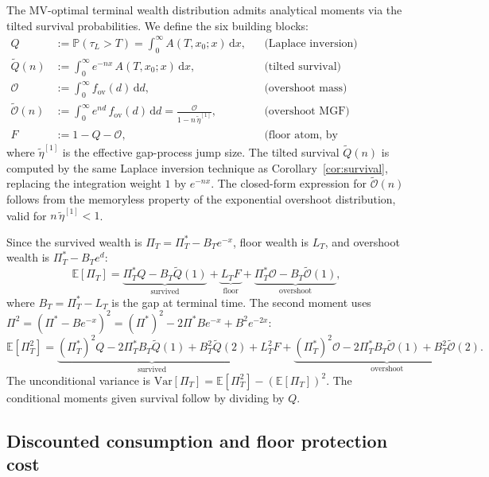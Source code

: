 \documentclass[11pt,a4paper]{article}
\numberwithin{equation}{section}
\newcommand{\E}{\mathbb{E}}
\newcommand{\Var}{\mathrm{Var}}
\newcommand{\Prob}{\mathbb{P}}
\newcommand{\Ov}{\mathcal{O}} %
\newcommand{\dd}{\mathrm{d}}
\begin{document}
The MV-optimal terminal wealth distribution admits analytical moments via the tilted survival probabilities. We define the six building blocks:
\begin{align}
Q &:= \Prob(\tau_L > T) = \int_0^\infty A(T, x_0; x)\,\dd x, 
  & &\text{(Laplace inversion)} \label{eq:Q_def}\\
\widetilde{Q}(n) &:= \int_0^\infty e^{-nx}\, A(T, x_0; x)\,\dd x, 
  & &\text{(tilted survival)} \label{eq:TQ_def}\\
\Ov &:= \int_0^\infty f_{\mathrm{ov}}(d)\,\dd d, 
  & &\text{(overshoot mass)} \label{eq:O_def}\\
\widetilde{\Ov}(n) &:= \int_0^\infty e^{nd}\, f_{\mathrm{ov}}(d)\,\dd d 
  = \frac{\Ov}{1 - n\,\tilde\eta^{[1]}}, 
  & &\text{(overshoot MGF)} \label{eq:TO_def}\\
F &:= 1 - Q - \Ov, 
  & &\text{(floor atom, by complement)} \label{eq:F_def}
\end{align}
where $\tilde\eta^{[1]}$ is the effective gap-process jump size. The 
tilted survival $\widetilde{Q}(n)$ is computed by the same Laplace 
inversion technique as Corollary~\ref{cor:survival}, replacing the 
integration weight $1$ by $e^{-nx}$. The closed-form expression for 
$\widetilde{\Ov}(n)$ follows from the memoryless property of the 
exponential overshoot distribution, valid for 
$n\,\tilde\eta^{[1]} < 1$.


Since the survived wealth is $\Pi_T = \Pi^*_T - B_T e^{-x}$, floor wealth is $L_T$, 
and overshoot wealth is $\Pi^*_T - B_T e^d$:
\begin{equation}\label{eq:E_Pi}
\E[\Pi_T] = \underbrace{\Pi^*_T Q - B_T \widetilde{Q}(1)}_{\text{survived}} 
  + \underbrace{L_T F}_{\text{floor}} 
  + \underbrace{\Pi^*_T \Ov - B_T \widetilde{\Ov}(1)}_{\text{overshoot}},
\end{equation}
where $B_T = \Pi^*_T - L_T$ is the gap at terminal time.
The second moment uses $\Pi^2 = (\Pi^* - Be^{-x})^2 
  = (\Pi^*)^2 - 2\Pi^* B e^{-x} + B^2 e^{-2x}$:
\begin{equation}\label{eq:E2_Pi}
\E[\Pi_T^2] = \underbrace{(\Pi^*_T)^2 Q - 2\Pi^*_T B_T \widetilde{Q}(1) 
  + B_T^2 \widetilde{Q}(2)}_{\text{survived}} + L_T^2 F 
  + \underbrace{(\Pi^*_T)^2 \Ov - 2\Pi^*_T B_T \widetilde{\Ov}(1) 
  + B_T^2 \widetilde{\Ov}(2)}_{\text{overshoot}}.
\end{equation}
The unconditional variance is $\Var[\Pi_T] = \E[\Pi_T^2] - (\E[\Pi_T])^2$. 
The conditional moments given survival follow by dividing by $Q$.


\subsection{Discounted consumption and floor protection cost}\label{sec:consumption}
\end{document}
